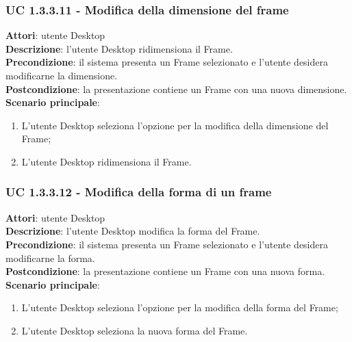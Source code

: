 \subsubsection{UC 1.3.3.11 - Modifica della dimensione del frame}{
	\label{uc1.3.3.11}
	\textbf{Attori}: utente Desktop \\
	\textbf{Descrizione}: l'utente Desktop ridimensiona il Frame. \\
	\textbf{Precondizione}: il sistema presenta un Frame selezionato e l'utente desidera modificarne la dimensione.	\\
	\textbf{Postcondizione}: la presentazione contiene un Frame con una nuova dimensione.	\\
	\textbf{Scenario principale}:
	\begin{enumerate}
		\item L'utente Desktop seleziona l'opzione per la modifica della dimensione del Frame;
		\item L'utente Desktop ridimensiona il Frame.
	\end{enumerate}
	}
\subsubsection{UC 1.3.3.12 - Modifica della forma di un frame}{
	\label{uc1.3.3.12}
	\textbf{Attori}: utente Desktop \\
	\textbf{Descrizione}: l'utente Desktop modifica la forma del Frame. \\
	\textbf{Precondizione}: il sistema presenta un Frame selezionato e l'utente desidera modificarne la forma.	\\
	\textbf{Postcondizione}: la presentazione contiene un Frame con una nuova forma.	\\
	\textbf{Scenario principale}:
	\begin{enumerate}
		\item L'utente Desktop seleziona l'opzione per la modifica della forma del Frame;
		\item L'utente Desktop seleziona la nuova forma del Frame.
	\end{enumerate}}

